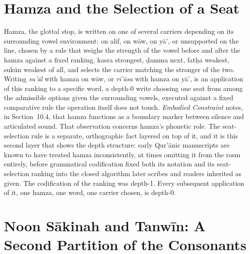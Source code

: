 \documentclass[11pt]{article}
\begin{document}
\section{Hamza and the Selection of a Seat}

Hamza, the glottal stop, is written on one of several carriers depending on
its surrounding vowel environment: on alif, on wāw, on yā', or unsupported
on the line, chosen by a rule that weighs the strength of the vowel before
and after the hamza against a fixed ranking, kasra strongest, ḍamma next,
fatḥa weakest, sukūn weakest of all, and selects the carrier matching the
stronger of the two. Writing \emph{su'āl} with hamza on wāw, or
\emph{ri'āsa} with hamza on yā', is an application of this ranking to a
specific word, a depth-0 write choosing one seat from among the admissible
options given the surrounding vowels, executed against a fixed comparative
rule the operation itself does not touch. \emph{Embodied Constraint}
notes, in Section~10.4, that hamza functions as a boundary marker between
silence and articulated sound. That observation concerns hamza's phonetic
role. The seat-selection rule is a separate, orthographic fact layered on
top of it, and it is this second layer that shows the depth structure:
early Qur'ānic manuscripts are known to have treated hamza inconsistently,
at times omitting it from the rasm entirely, before grammatical
codification fixed both its notation and its seat-selection ranking into
the closed algorithm later scribes and readers inherited as given. The
codification of the ranking was depth-1. Every subsequent application of
it, one hamza, one word, one carrier chosen, is depth-0.

\section{Noon Sākinah and Tanwīn: A Second Partition of the Consonants}
\end{document}
